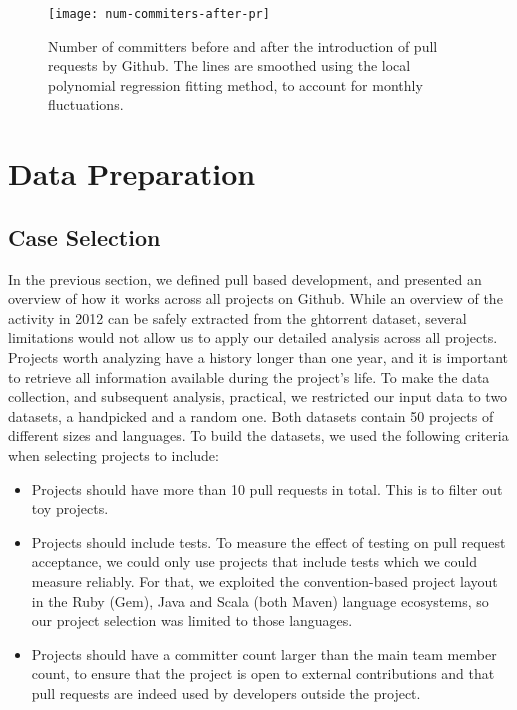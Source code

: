 \documentclass{sig-alternate}
\begin{document}
\begin{figure}
  \begin{center}
    \texttt{[image: num-commiters-after-pr]}
  \end{center}
  \caption{Number of committers before and after the introduction of pull
  requests by Github. The lines are smoothed using the local polynomial
  regression fitting method, to account for monthly fluctuations.}
  \label{fig:before-after-pr}
\end{figure}

\section{Data Preparation}

\subsection{Case Selection}
\label{sec:caseselection}
In the previous section, we defined pull based development, and presented an
overview of how it works across all projects on Github. While an overview of
the activity in 2012 can be safely extracted from the {\sc ght}orrent dataset, several
limitations would not allow us to apply our detailed analysis across all
projects. Projects worth analyzing have a history longer than one year, and
it is important to retrieve all information available during the project's
life. To make the data collection, and subsequent analysis, practical, we
restricted our input data to two datasets, a \textsf{handpicked} and a
\textsf{random} one. Both datasets contain 50 projects of different sizes
and languages. To build the datasets, we used the following criteria when selecting
projects to include:

\begin{itemize}

  \item Projects should have more than 10 pull requests in total. This is
    to filter out toy projects. 

  \item Projects should include tests. To measure the effect of testing on pull
    request acceptance, we could only use projects that include tests which we
    could measure reliably. For that, we exploited the convention-based project
    layout in the Ruby (Gem), Java and Scala (both Maven) language ecosystems,
    so our project selection was limited to those languages. 

  \item Projects should have a committer count larger than the main team member
    count, to ensure that the project is open to external contributions and that
    pull requests are indeed used by developers outside the project.

\end{itemize}
\end{document}
